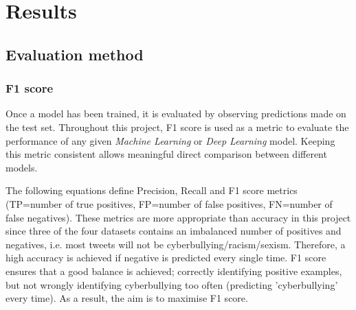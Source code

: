 \documentclass[12pt,a4paper]{article}
\begin{document}
\section{Results}
\subsection{Evaluation method}
\subsubsection{F1 score}
Once a model has been trained, it is evaluated by observing predictions made on the test set. Throughout this project, F1 score is used as a metric to evaluate the performance of any given \textit{Machine Learning} or \textit{Deep Learning} model. Keeping this metric consistent allows meaningful direct comparison between different models.

The following equations define Precision, Recall and F1 score metrics (TP=number of true positives, FP=number of false positives, FN=number of false negatives). These metrics are more appropriate than accuracy in this project since three of the four datasets contains an imbalanced number of positives and negatives, i.e. most tweets will not be cyberbullying/racism/sexism. Therefore, a high accuracy is achieved if negative is predicted every single time. F1 score ensures that a good balance is achieved; correctly identifying positive examples, but not wrongly identifying cyberbullying too often (predicting 'cyberbullying' every time). As a result, the aim is to maximise F1 score.
\end{document}
